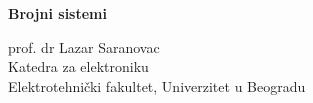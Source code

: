 \begin{frame}[label=04-s001]{}
\par\vspace{6mm}
{\fontsize{26}{30}\selectfont\bfseries Brojni sistemi\par}
\par\vspace{4mm}{\color{Accent}\rule{36mm}{1.2pt}}\par
\vspace{5mm}prof. dr Lazar Saranovac\\
Katedra za elektroniku\\
Elektrotehnički fakultet, Univerzitet u Beogradu\par
\vspace{4mm}
\end{frame}
